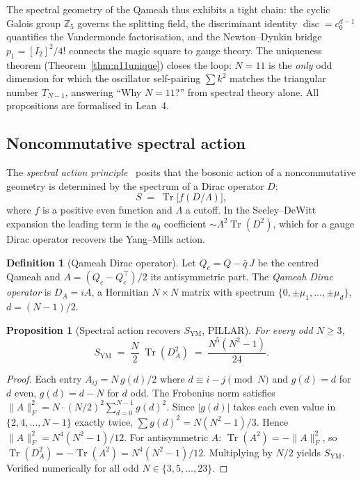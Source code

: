 \documentclass[aps,prd,twocolumn,superscriptaddress,floatfix,nofootinbib]{revtex4-2}
\newtheorem{proposition}[theorem]{Proposition}
\theoremstyle{definition}
\newtheorem{definition}[theorem]{Definition}
\theoremstyle{remark}
\begin{document}
The spectral geometry of the Qameah thus exhibits a tight chain:
the cyclic Galois group $\mathbb{Z}_5$ governs the splitting field,
the discriminant identity $\operatorname{disc}=c_0^{d-1}$
quantifies the Vandermonde factorisation, and the Newton--Dynkin
bridge $p_1 = [I_2]^2/4!$ connects the magic square to gauge theory.
The uniqueness theorem (Theorem~\ref{thm:n11unique}) closes the loop:
$N=11$ is the \emph{only} odd dimension for which the oscillator
self-pairing $\sum k^2$ matches the triangular number $T_{N-1}$,
answering ``Why $N=11$?'' from spectral theory alone.
All propositions are formalised in Lean~4.

\subsection{Noncommutative spectral action}
\label{sec:ncg-spectral-action}

The \emph{spectral action principle}~\cite{chamseddine1996} posits that
the bosonic action of a noncommutative geometry is determined by the
spectrum of a Dirac operator $D$:
\[
  S \;=\; \operatorname{Tr}\bigl[f(D/\Lambda)\bigr],
\]
where $f$ is a positive even function and $\Lambda$ a cutoff.
In the Seeley--DeWitt expansion the leading term is the $a_0$
coefficient $\sim \Lambda^2 \operatorname{Tr}(D^2)$, which for a
gauge Dirac operator recovers the Yang--Mills action.

\begin{definition}[Qameah Dirac operator]
\label{def:qameah-dirac}
Let $Q_c = Q - \bar{q}\,J$ be the centred Qameah and
$A = (Q_c - Q_c^{\!\top})/2$ its antisymmetric part.
The \emph{Qameah Dirac operator} is
$D_A = iA$, a Hermitian $N{\times}N$ matrix with
spectrum $\{0,\pm\mu_1,\ldots,\pm\mu_d\}$, $d=(N{-}1)/2$.
\end{definition}

\begin{proposition}[Spectral action recovers $S_{\mathrm{YM}}$, PILLAR]
\label{prop:ncg-spectral-action}
For every odd $N \geq 3$,
\begin{equation}
\label{eq:ncg-spectral-action}
  S_{\mathrm{YM}}
  \;=\; \frac{N}{2}\;\operatorname{Tr}(D_A^2)
  \;=\; \frac{N^5(N^2-1)}{24}.
\end{equation}
\end{proposition}

\begin{proof}
Each entry $A_{ij} = N\,g(d)/2$ where $d \equiv i{-}j \pmod{N}$
and $g(d) = d$ for $d$ even, $g(d) = d{-}N$ for $d$ odd.
The Frobenius norm satisfies $\lVert A\rVert_F^2
= N \cdot (N/2)^2 \sum_{d=0}^{N-1} g(d)^2$.
Since $|g(d)|$ takes each even value in $\{2,4,\ldots,N{-}1\}$
exactly twice, $\sum g(d)^2 = N(N^2{-}1)/3$.
Hence $\lVert A\rVert_F^2 = N^4(N^2{-}1)/12$.
For antisymmetric $A$: $\operatorname{Tr}(A^2) = -\lVert A\rVert_F^2$,
so $\operatorname{Tr}(D_A^2) = -\operatorname{Tr}(A^2)
= N^4(N^2{-}1)/12$.  Multiplying by $N/2$ yields $S_{\mathrm{YM}}$.
Verified numerically for all odd $N \in \{3,5,\ldots,23\}$.
\end{proof}
\end{document}
